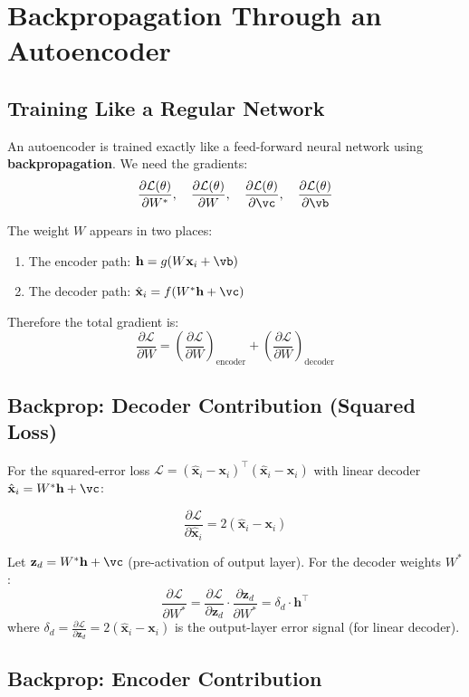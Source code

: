 \documentclass[12pt,a4paper]{article}
\newcommand{\vx}{\mathbf{x}}
\newcommand{\vh}{\mathbf{h}}
\newcommand{\hatx}{\hat{\mathbf{x}}}
\newcommand{\Loss}{\mathcal{L}}
\begin{document}
\section{Backpropagation Through an Autoencoder}

\subsection{Training Like a Regular Network}

An autoencoder is trained exactly like a feed-forward neural network using \textbf{backpropagation}. We need the gradients:
\[
\frac{\partial\Loss(\theta)}{\partial W^*},\quad
\frac{\partial\Loss(\theta)}{\partial W},\quad
\frac{\partial\Loss(\theta)}{\partial \vc},\quad
\frac{\partial\Loss(\theta)}{\partial \vb}
\]

The weight $W$ appears in two places:
\begin{enumerate}
  \item The encoder path: $\vh = g(W\vx_i + \vb)$
  \item The decoder path: $\hatx_i = f(W^*\vh + \vc)$
\end{enumerate}

Therefore the total gradient is:
\[
\frac{\partial\Loss}{\partial W}
= \left(\frac{\partial\Loss}{\partial W}\right)_{\text{encoder}}
+ \left(\frac{\partial\Loss}{\partial W}\right)_{\text{decoder}}
\]

\subsection{Backprop: Decoder Contribution (Squared Loss)}

For the squared-error loss $\Loss = (\hatx_i - \vx_i)^\top(\hatx_i - \vx_i)$ with linear decoder $\hatx_i = W^*\vh + \vc$:

\[
\frac{\partial\Loss}{\partial\hatx_i} = 2(\hatx_i - \vx_i)
\]

Let $\mathbf{z}_d = W^*\vh + \vc$ (pre-activation of output layer). For the decoder weights $W^*$:
\[
\frac{\partial\Loss}{\partial W^*}
= \frac{\partial\Loss}{\partial \mathbf{z}_d} \cdot \frac{\partial \mathbf{z}_d}{\partial W^*}
= \delta_d \cdot \vh^\top
\]
where $\delta_d = \frac{\partial\Loss}{\partial \mathbf{z}_d} = 2(\hatx_i - \vx_i)$ is the output-layer error signal (for linear decoder).

\subsection{Backprop: Encoder Contribution}
\end{document}
